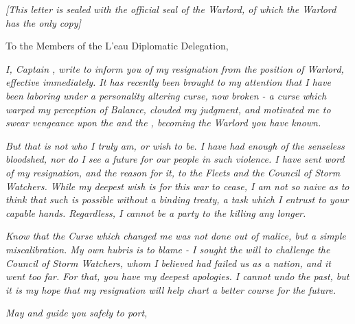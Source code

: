 \documentclass[white]{GL2020}
\begin{document}
\name{\wWarlordResignationOfficial{}}

\emph{[This letter is sealed with the official seal of the Warlord, of which the Warlord has the only copy]}

To the Members of the L’eau Diplomatic Delegation,

\textsl{I, Captain \cLoud{\Full}, write to inform you of my resignation from the position of Warlord, effective immediately. It has recently been brought to my attention that I have been laboring under a personality altering curse, now broken - a curse which warped my perception of Balance, clouded my judgment, and motivated me to swear vengeance upon the \pFarm{} and the \pTech{}, becoming the Warlord you have known.}

\textsl{But that is not who I truly am, or wish to be. I have had enough of the senseless bloodshed, nor do I see a future for our people in such violence. I have sent word of my resignation, and the reason for it, to the Fleets and the Council of Storm Watchers. While my deepest wish is for this war to cease, I am not so naive as to think that such is possible without a binding treaty, a task which I entrust to your capable hands. Regardless, I cannot be a party to the killing any longer.}

\textsl{Know that the Curse which changed me was not done out of malice, but a simple miscalibration. My own hubris is to blame - I sought the will to challenge the Council of Storm Watchers, whom I believed had failed us as a nation, and it went too far. For that, you have my deepest apologies. I cannot undo the past, but it is my hope that my resignation will help chart a better course for the future.}

\textsl{May \cEbb{} and \cFlow{} guide you safely to port,}
\textsl{\cLoud{\Full}}
\end{document}
